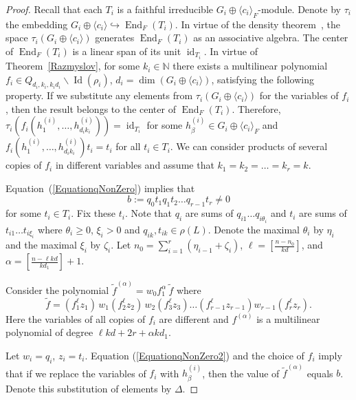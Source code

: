 \documentclass[12pt, reqno, a4paper]{amsart}
\theoremstyle{plain}
\theoremstyle{remark}
\theoremstyle{definition}
\begin{document}
\begin{proof}
Recall that each $T_i$ is a faithful irreducible $G_i\oplus\langle c_i\rangle_F$-module.
Denote by $\tau_i$ the embedding $G_i\oplus\langle c_i\rangle \hookrightarrow \operatorname{End}_F(T_i)$.
In virtue of the density theorem~\cite[Section 4.3]{Jacobson},  the space $\tau_i(G_i\oplus\langle c_i\rangle)$
generates $\operatorname{End}_F(T_i)$ as an associative algebra.
The center of $\operatorname{End}_F(T_i)$ is a linear span of its unit $\operatorname{id}_{T_i}$.
In virtue of Theorem~\ref{Razmyslov}, for some $k_i \in \mathbb N$
there exists a multilinear polynomial $f_i \in Q_{d_i,k_i, k_i d_i} \backslash \operatorname{Id}(\rho_i)$,
$d_i = \dim (G_i\oplus\langle c_i\rangle)$, satisfying the following property.
If we substitute any elements from $\tau_i(G_i\oplus\langle c_i\rangle)$ for the variables of $f_i$,
then the result belongs to the center of $\operatorname{End}_F(T_i)$.
Therefore, $\tau_i(f_i(h^{(i)}_1, \ldots, h^{(i)}_{d_i k_i})) = \operatorname{id}_{T_i}$ for some
$h^{(i)}_\beta \in G_i\oplus\langle c_i\rangle_F$
and $f_i(h^{(i)}_1, \ldots, h^{(i)}_{d_i k_i})t_i = t_i$ for all $t_i\in T_i$. We can
consider products of several copies of $f_i$ in different variables
and assume that $k_1 = k_2 = \ldots = k_r = k$.

Equation~(\ref{EquationqNonZero}) implies
that
\begin{equation}\label{EquationqNonZero2}
 b:=q_0 t_1 q_1 t_2 \ldots q_{r-1} t_r \ne 0
 \end{equation}
for some $t_i \in T_i$. Fix these $t_i$.
Note that $q_i$ are sums of $q_{i1} \ldots q_{i\theta_i}$
and  $t_i$ are sums of $t_{i1} \ldots t_{i\xi_i}$ where $\theta_i \geqslant 0$,
$\xi_i > 0$ and  $q_{ik}, t_{ik}\in\rho(L)$. Denote the maximal
 $\theta_i$ by $\eta_i$ and the maximal
 $\xi_i$ by $\zeta_i$. Let
 $n_0=\sum_{i=1}^r (\eta_{i-1}+\zeta_i)$,
 $\ell=\left[ \frac{n-n_0}{kd}\right]$, and
 $\alpha=\left[ \frac{n-\ell kd}{kd_1}\right]+1$.

 Consider the polynomial
$\tilde f^{(\alpha)} = w_0 f_1^{\alpha}\ \tilde f$ where
$$\tilde f = (f_1^{\ell} z_1)\, w_1
(f_2^{\ell} z_2)\, w_2
(f_3^{\ell} z_3) \ldots (f_{r-1}^{\ell} z_{r-1}) w_{r-1}
(f_r^{\ell} z_r).$$
Here the variables of all copies of $f_i$ are
different and $f^{(\alpha)}$ is a multilinear polynomial of degree
$\ell k d + 2r + \alpha k d_1$.

Let $w_i=q_i$, $z_i=t_i$. Equation (\ref{EquationqNonZero2}) and the choice of $f_i$
imply that if we replace the variables of $f_i$ with $h^{(i)}_\beta$, then
the value of $\tilde f^{(\alpha)}$ equals $b$. Denote this substitution of elements by $\Delta$.


\end{proof}
\end{document}
